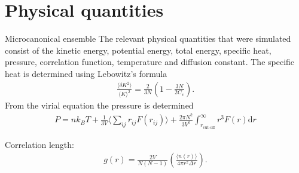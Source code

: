 \section{Physical quantities}
Microcanonical ensemble
The relevant physical quantities that were simulated consist of the kinetic energy, potential energy, total energy, specific heat, pressure, correlation function, temperature and diffusion constant. 
The specific heat is determined using Lebowitz's formula \cite{jos}
\begin{gather*}
    \frac{\langle \delta K^2\rangle}{\langle K\rangle^2}=\frac{2}{3N}\left( 1-\frac{3N}{2C_v}\right).
\end{gather*}
From the virial equation the pressure is determined 
\begin{gather*}
    P = nk_BT + \frac{1}{3V}\Big \langle \sum_{ij} r_{ij}F(r_{ij})\Big \rangle + \frac{2\pi N^2}{3V^2}\int_{r_{\text{cut-off}}}^{\infty}r^3 F(r) \text{d}r
\end{gather*}

Correlation length:
\begin{gather*}
    g(r)=\frac{2V}{N(N-1)}\left(\frac{\langle n(r)\rangle}{4\pi r^2\Delta r}\right).
\end{gather*}